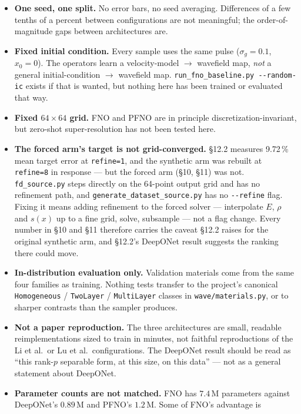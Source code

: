 \documentclass[11pt,a4paper]{article}
\begin{document}
\begin{itemize}[leftmargin=*,itemsep=3pt]
\item \textbf{One seed, one split.} No error bars, no seed averaging.
Differences of a few tenths of a percent between configurations are not
meaningful; the order-of-magnitude gaps between architectures are.
\item \textbf{Fixed initial condition.} Every sample uses the same pulse
($\sigma_g=0.1$, $x_0=0$). The operators learn a velocity-model $\rightarrow$
wavefield map, \emph{not} a general initial-condition $\rightarrow$ wavefield
map. \texttt{run\_fno\_baseline.py -{}-random-ic} exists if that is wanted, but
nothing here has been trained or evaluated that way.
\item \textbf{Fixed $64\times64$ grid.} FNO and PFNO are in principle
discretization-invariant, but zero-shot super-resolution has not been tested
here.
\item \textbf{The forced arm's target is not grid-converged.} \S12.2 measures
9.72\,\% mean target error at \texttt{refine=1}, and the synthetic arm was
rebuilt at \texttt{refine=8} in response --- but the forced arm (\S10, \S11) was
not. \texttt{fd\_source.py} steps directly on the 64-point output grid and has
no refinement path, and \texttt{generate\_dataset\_source.py} has no
\texttt{-{}-refine} flag. Fixing it means adding refinement to the forced solver
--- interpolate $E$, $\rho$ and $s(x)$ up to a fine grid, solve, subsample ---
not a flag change. Every number in \S10 and \S11 therefore carries the caveat
\S12.2 raises for the original synthetic arm, and \S12.2's DeepONet result
suggests the ranking there could move.
\item \textbf{In-distribution evaluation only.} Validation materials come from
the same four families as training. Nothing tests transfer to the project's
canonical \texttt{Homogeneous} / \texttt{TwoLayer} / \texttt{MultiLayer} classes
in \texttt{wave/materials.py}, or to sharper contrasts than the sampler
produces.
\item \textbf{Not a paper reproduction.} The three architectures are small,
readable reimplementations sized to train in minutes, not faithful
reproductions of the Li et al.\ or Lu et al.\ configurations. The DeepONet
result should be read as ``this rank-$p$ separable form, at this size, on this
data'' --- not as a general statement about DeepONet.
\item \textbf{Parameter counts are not matched.} FNO has $7.4$\,M parameters
against DeepONet's $0.89$\,M and PFNO's $1.2$\,M. Some of FNO's advantage is

\end{itemize}
\end{document}
